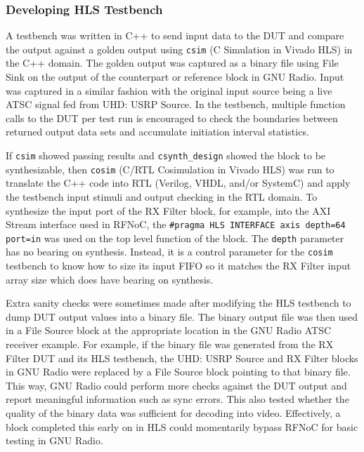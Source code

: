 \documentclass{article}
\begin{document}
\subsubsection*{Developing HLS Testbench} A testbench was written in C++ to send input data to the DUT and compare the output against a golden output using {\tt csim} (C Simulation in Vivado HLS) in the C++ domain. The golden output was captured as a binary file using File Sink on the output of the counterpart or reference block in GNU Radio. Input was captured in a similar fashion with the original input source being a live ATSC signal fed from UHD: USRP Source. In the testbench, multiple function calls to the DUT per test run is encouraged to check the boundaries between returned output data sets and accumulate initiation interval statistics.

If {\tt csim} showed passing results and {\tt csynth\_design} showed the block to be synthesizable, then {\tt cosim} (C/RTL Cosimulation in Vivado HLS) was run to translate the C++ code into RTL (Verilog, VHDL, and/or SystemC) and apply the testbench input stimuli and output checking in the RTL domain. To synthesize the input port of the RX Filter block, for example, into the AXI Stream interface used in RFNoC, the {\tt \#pragma HLS INTERFACE axis depth=64 port=in} was used on the top level function of the block. The {\tt depth} parameter has no bearing on synthesis. Instead, it is a control parameter for the {\tt cosim} testbench to know how to size its input FIFO so it matches the RX Filter input array size which does have bearing on synthesis.

Extra sanity checks were sometimes made after modifying the HLS testbench to dump DUT output values into a binary file. The binary output file was then used in a File Source block at the appropriate location in the GNU Radio ATSC receiver example. For example, if the binary file was generated from the RX Filter DUT and its HLS testbench, the UHD: USRP Source and RX Filter blocks in GNU Radio were replaced by a File Source block pointing to that binary file. This way, GNU Radio could perform more checks against the DUT output and report meaningful information such as sync errors. This also tested whether the quality of the binary data was sufficient for decoding into video. Effectively, a block completed this early on in HLS could momentarily bypass RFNoC for basic testing in GNU Radio.
\end{document}
